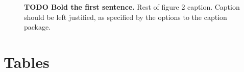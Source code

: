 \documentclass[10pt]{article}
\begin{document}
\begin{figure}[!ht]
\begin{center}
\end{center}
\caption{
{\bf TODO Bold the first sentence.}  Rest of figure 2  caption.  Caption 
should be left justified, as specified by the options to the caption 
package.
}
\label{fig:femaledefault}
\end{figure}

\section*{Tables}
\end{document}

